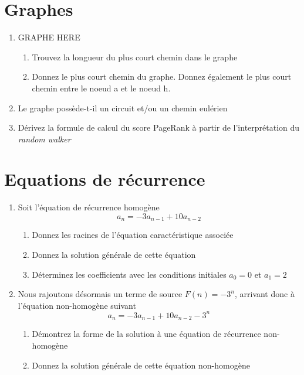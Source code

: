 \documentclass[A4paper,11pt]{article}
\begin{document}
\section{Graphes}
\begin{enumerate}
    \item GRAPHE HERE\begin{enumerate}
    \item Trouvez la longueur du plus court chemin dans le graphe 
    \item Donnez le plus court chemin du graphe. Donnez également le plus court chemin entre le noeud a et le noeud h.
    \end{enumerate}
    \item Le graphe possède-t-il un circuit et/ou un chemin eulérien
    \item Dérivez la formule de calcul du score PageRank à partir de l'interprétation du \textit{random walker}
\end{enumerate}

\section{Equations de récurrence}
\begin{enumerate}
    \item Soit l'équation de récurrence homogène 
    \[ a_n = -3a_{n-1} + 10a_{n-2}\]
    \begin{enumerate}
        \item Donnez les racines de l'équation caractéristique associée
        \item Donnez la solution générale de cette équation
        \item Déterminez les coefficients avec les conditions initiales $a_0 = 0$ et $a_1 = 2$
    \end{enumerate}
    \item Nous rajoutons désormais un terme de source $F(n) = - 3^n$, arrivant donc à l'équation non-homogène suivant
    \[ a_n = -3a_{n-1} + 10a_{n-2} - 3^n\]
    \begin{enumerate}
        \item Démontrez la forme de la solution à une équation de récurrence non-homogène
         \item Donnez la solution générale de cette équation non-homogène
    \end{enumerate}
\end{enumerate}
\end{document}
